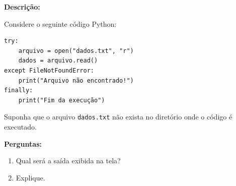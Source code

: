 \textbf{Descrição:}

Considere o seguinte código Python:

\begin{verbatim}
try:
    arquivo = open("dados.txt", "r")
    dados = arquivo.read()
except FileNotFoundError:
    print("Arquivo não encontrado!")
finally:
    print("Fim da execução")
\end{verbatim}

Suponha que o arquivo \texttt{dados.txt} não exista no diretório onde o código é executado.

\textbf{Perguntas:}

\begin{enumerate}
    \item[a)] Qual será a saída exibida na tela?
    \item[b)] Explique.
\end{enumerate}




